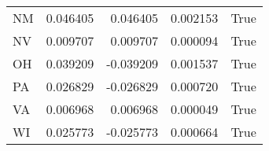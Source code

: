 \begin{table}
\begin{tabular}{lrrrl}
      NM &   0.046405 &  0.046405 &       0.002153 &          True \\
      NV &   0.009707 &  0.009707 &       0.000094 &          True \\
      OH &   0.039209 & -0.039209 &       0.001537 &          True \\
      PA &   0.026829 & -0.026829 &       0.000720 &          True \\
      VA &   0.006968 &  0.006968 &       0.000049 &          True \\
      WI &   0.025773 & -0.025773 &       0.000664 &          True \\
\bottomrule
\end{tabular}
\end{table}
